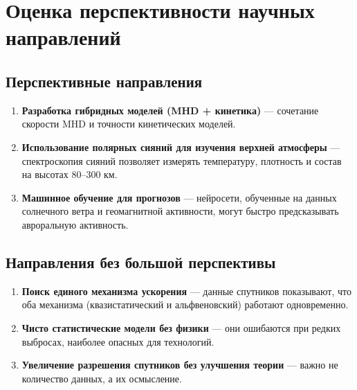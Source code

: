 \section{Оценка перспективности научных направлений}

\subsection{Перспективные направления}

\begin{enumerate}
    \item \textbf{Разработка гибридных моделей (MHD + кинетика)} --- сочетание скорости MHD и точности кинетических моделей.
    \item \textbf{Использование полярных сияний для изучения верхней атмосферы} --- спектроскопия сияний позволяет измерять температуру, плотность и состав на высотах 80--300 км.
    \item \textbf{Машинное обучение для прогнозов} --- нейросети, обученные на данных солнечного ветра и геомагнитной активности, могут быстро предсказывать авроральную активность.
\end{enumerate}

\subsection{Направления без большой перспективы}

\begin{enumerate}
    \item \textbf{Поиск единого механизма ускорения} --- данные спутников показывают, что оба механизма (квазистатический и альфвеновский) работают одновременно.
    \item \textbf{Чисто статистические модели без физики} --- они ошибаются при редких выбросах, наиболее опасных для технологий.
    \item \textbf{Увеличение разрешения спутников без улучшения теории} --- важно не количество данных, а их осмысление.
\end{enumerate}
